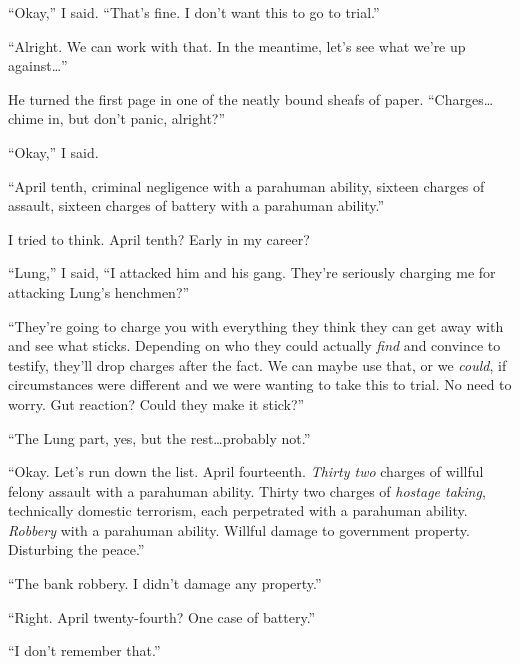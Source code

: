 ``Okay,'' I said.  ``That's fine.  I don't want this to go to trial.''



``Alright.  We can work with that.  In the meantime, let's see what we're up against\ldots''



He turned the first page in one of the neatly bound sheafs of paper.  ``Charges\ldots chime in, but don't panic, alright?''



``Okay,'' I said.



``April tenth, criminal negligence with a parahuman ability, sixteen charges of assault, sixteen charges of battery with a parahuman ability.''



I tried to think.  April tenth?  Early in my career?



``Lung,'' I said, ``I attacked him and his gang.  They're seriously charging me for attacking Lung's henchmen?''



``They're going to charge you with everything they think they can get away with and see what sticks.  Depending on who they could actually \emph{find} and convince to testify, they'll drop charges after the fact.  We can maybe use that, or we \emph{could}, if circumstances were different and we were wanting to take this to trial.  No need to worry.  Gut reaction?  Could they make it stick?''



``The Lung part, yes, but the rest\ldots probably not.''



``Okay.  Let's run down the list.  April fourteenth.  \emph{Thirty two} charges of willful felony assault with a parahuman ability.  Thirty two charges of \emph{hostage taking}, technically domestic terrorism, each perpetrated with a parahuman ability.  \emph{Robbery} with a parahuman ability.  Willful damage to government property.  Disturbing the peace.''



``The bank robbery.  I didn't damage any property.''



``Right.  April twenty-fourth?  One case of battery.''



``I don't remember that.''



